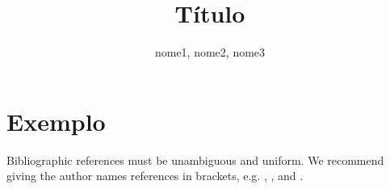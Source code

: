 \documentclass[12pt]{article}
\title{Título}
\author{nome1\inst{1}, nome2\inst{2}, nome3\inst{1}}
\begin{document}
\maketitle

\begin{abstract}

\end{abstract}

\begin{resumo}

\end{resumo}

\section{Exemplo}

Bibliographic references must be unambiguous and uniform.  We recommend giving
the author names references in brackets, e.g. \cite{knuth:84},
\cite{boulic:91}, and \cite{smith:99}.



\end{document}
